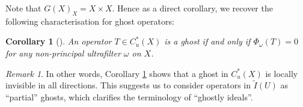 \documentclass[12pt, a4paper]{amsart}
\numberwithin{equation}{section}
\newtheorem{cor}[thm]{Corollary}
\theoremstyle{definition}
\newtheorem{defn}[thm]{Definition}
\theoremstyle{remark}
\newtheorem{rem}[thm]{Remark}
\begin{document}
%

Note that $G(X)_X = X \times X$. Hence as a direct corollary, we recover the following characterisation for ghost operators:

\begin{cor}[{\cite[Proposition 8.2]{SW17}}]\label{cor:char for ghost}
An operator $T \in C^*_u(X)$ is a ghost \emph{if and only if} $\Phi_\omega(T)=0$ for any non-principal ultrafilter $\omega$ on $X$.
\end{cor}


\begin{rem}\label{rem: terminology exp. for ghostly ideals}
In other words, Corollary \ref{cor:char for ghost} shows that a ghost in $C^*_u(X)$ is locally invisible in all directions. This suggests us to consider operators in $\tilde{I}(U)$ as ``partial'' ghosts, which clarifies the terminology of ``ghostly ideals''.
\end{rem}
\end{document}
